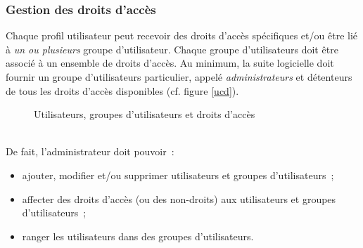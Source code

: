 \subsubsection{Gestion des droits d'accès}
Chaque profil utilisateur peut recevoir des droits d'accès spécifiques et/ou être lié à \emph{un ou plusieurs} groupe d'utilisateur.
Chaque groupe d'utilisateurs doit être associé à un ensemble de droits d'accès.
Au minimum, la suite logicielle doit fournir un groupe d'utilisateurs particulier, appelé \emph{administrateurs} et détenteurs de tous les droits d'accès disponibles (cf. figure \ref{ucd}).
\begin{figure}[htbp] %
	\centering
	\caption{Utilisateurs, groupes d'utilisateurs et droits d'accès}
	\label{ar}
\end{figure}
\\De fait, l'administrateur doit pouvoir~:
\begin{itemize}
	\item ajouter, modifier et/ou supprimer utilisateurs et groupes d'utilisateurs~;
	\item affecter des droits d'accès (ou des non-droits) aux utilisateurs et groupes d'utilisateurs~;
	\item ranger les utilisateurs dans des groupes d'utilisateurs.
\end{itemize}
